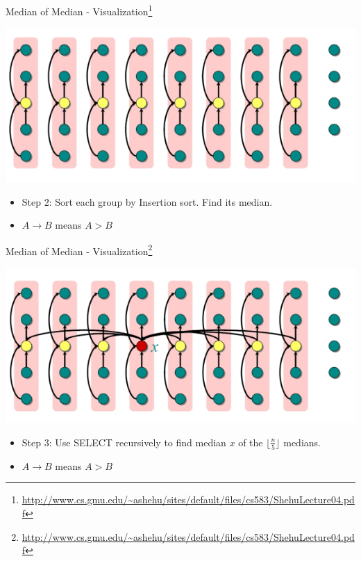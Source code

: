 \documentclass{beamer}
\begin{document}
\begin{frame}{Median of Median - Visualization\footnote{\url{http://www.cs.gmu.edu/~ashehu/sites/default/files/cs583/ShehuLecture04.pdf}}}
\begin{center}
    \includegraphics[scale=0.4]{medianOfMedian3.png}
\end{center}
\begin{itemize}
    \item Step 2: Sort each group by Insertion sort. Find its median.
    \item $A \rightarrow B$ means $A > B$
\end{itemize}
\end{frame}




\begin{frame}{Median of Median - Visualization\footnote{\url{http://www.cs.gmu.edu/~ashehu/sites/default/files/cs583/ShehuLecture04.pdf}}}
\begin{center}
    \includegraphics[scale=0.4]{medianOfMedian4.png}
\end{center}
\begin{itemize}
    \item Step 3: Use SELECT recursively to find median $x$ of the $\lfloor \frac{n}{5} \rfloor$ medians. 
    \item $A \rightarrow B$ means $A > B$
\end{itemize}
\end{frame}
\end{document}
